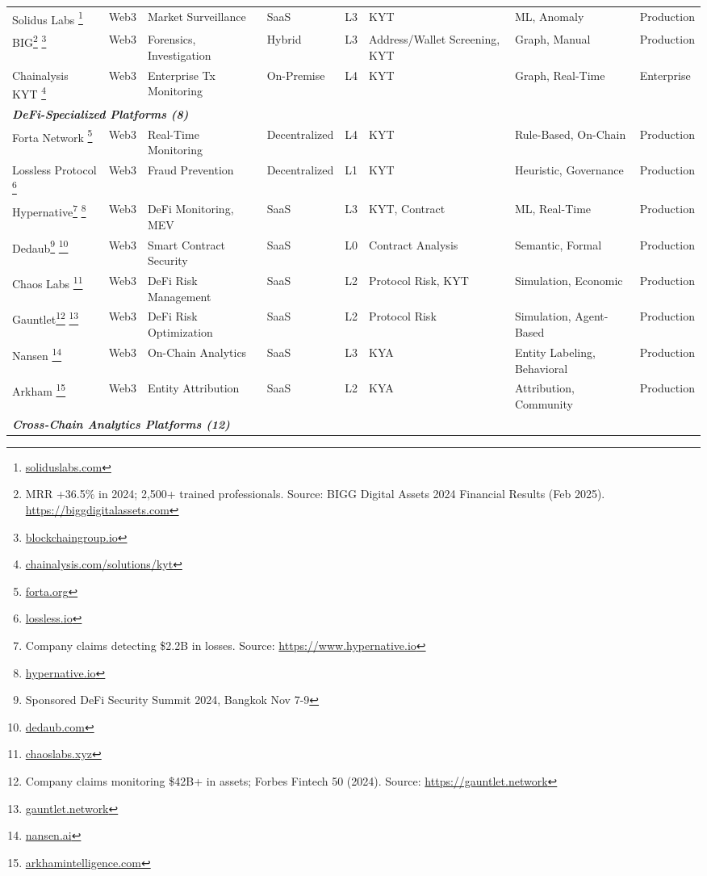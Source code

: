 \begin{table}[htbp]
\begin{tabularx}{\textwidth}{p{1.5cm}p{0.9cm}X p{1.1cm}p{1.2cm}p{1.1cm}X p{0.9cm}}
Solidus Labs \footnote{\url{soliduslabs.com}} & Web3 & Market Surveillance & SaaS & L3 & KYT & ML, Anomaly & Production \\
BIG\footnote{MRR +36.5\% in 2024; 2,500+ trained professionals. Source: BIGG Digital Assets 2024 Financial Results (Feb 2025). \url{https://biggdigitalassets.com}} \footnote{\url{blockchaingroup.io}} & Web3 & Forensics, Investigation & Hybrid & L3 & Address/Wallet Screening, KYT & Graph, Manual & Production \\
Chainalysis KYT \footnote{\url{chainalysis.com/solutions/kyt}} & Web3 & Enterprise Tx Monitoring & On-Premise & L4 & KYT & Graph, Real-Time & Enterprise \\
\hline
\multicolumn{8}{l}{\textit{\textbf{DeFi-Specialized Platforms (8)}}} \\
\hline
Forta Network \footnote{\url{forta.org}} & Web3 & Real-Time Monitoring & Decentralized & L4 & KYT & Rule-Based, On-Chain & Production \\
Lossless Protocol \footnote{\url{lossless.io}} & Web3 & Fraud Prevention & Decentralized & L1 & KYT & Heuristic, Governance & Production \\
Hypernative\footnote{Company claims detecting \$2.2B in losses. Source: \url{https://www.hypernative.io}} \footnote{\url{hypernative.io}} & Web3 & DeFi Monitoring, MEV & SaaS & L3 & KYT, Contract & ML, Real-Time & Production \\
Dedaub\footnote{Sponsored DeFi Security Summit 2024, Bangkok Nov 7-9} \footnote{\url{dedaub.com}} & Web3 & Smart Contract Security & SaaS & L0 & Contract Analysis & Semantic, Formal & Production \\
Chaos Labs \footnote{\url{chaoslabs.xyz}} & Web3 & DeFi Risk Management & SaaS & L2 & Protocol Risk, KYT & Simulation, Economic & Production \\
Gauntlet\footnote{Company claims monitoring \$42B+ in assets; Forbes Fintech 50 (2024). Source: \url{https://gauntlet.network}} \footnote{\url{gauntlet.network}} & Web3 & DeFi Risk Optimization & SaaS & L2 & Protocol Risk & Simulation, Agent-Based & Production \\
Nansen \footnote{\url{nansen.ai}} & Web3 & On-Chain Analytics & SaaS & L3 & KYA & Entity Labeling, Behavioral & Production \\
Arkham \footnote{\url{arkhamintelligence.com}} & Web3 & Entity Attribution & SaaS & L2 & KYA & Attribution, Community & Production \\
\hline
\multicolumn{8}{l}{\textit{\textbf{Cross-Chain Analytics Platforms (12)}}} \\

\end{tabularx}
\end{table}
